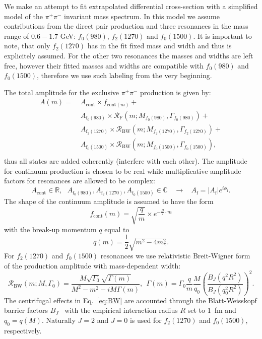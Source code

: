 We make an attempt to fit extrapolated differential cross-section with a simplified model of the $\pi^{+}\pi^{-}$ invariant mass spectrum. In this model we assume contributions from the direct pair production and three resonances in the mass range of $0.6-1.7$ GeV: $f_0(980)$, $f_2(1270)$ and $f_0(1500)$. It is important to note, that only $f_{2}(1270)$ has in the fit fixed mass and width and thus is explicitely assumed. For the other two resonances the masses and widths are left free, however their fitted masses and widths are compatible with $f_0(980)$ and $f_0(1500)$, therefore we use such labeling from the very beginning.

The total amplitude for the exclusive $\pi^{+}\pi^{-}$ production is given by:
%
\begin{equation}
\label{eq:amplitude}
\begin{aligned}
A(m) = & \;A_{\textrm{cont}}\times f_{\textrm{cont}(m)}+ \\
        & \;A_{\textrm{f}_0(980)} \times \mathcal{R}_{\textrm{F}}\left(m;M_{f_0(980)},\Gamma_{f_0(980)}\right)+ \\
        & \;A_{\textrm{f}_2(1270)} \times \mathcal{R}_{\textrm{BW}}\left(m;M_{f_2(1270)},\Gamma_{f_2(1270)}\right) +\\
        & \;A_{\textrm{f}_0(1500)} \times \mathcal{R}_{\textrm{BW}}\left(m;M_{f_0(1500)},\Gamma_{f_0(1500)}\right),\\
\end{aligned}
\end{equation}
%
thus all states are added coherently (interfere with each other). The amplitude for continuum production is chosen to be real while multiplicative amplitude factors for resonances are allowed to be complex:
\begin{equation}A_{\textrm{cont}}\in\mathbb{R},~~~A_{\textrm{f}_0(980)},A_{\textrm{f}_2(1270)},A_{\textrm{f}_0(1500)}\in\mathbb{C}~~~~\rightarrow~~~~A_{\textrm{f}}=|A_{\textrm{f}}|e^{i\phi_{\textrm{f}}}.\end{equation}
%
The shape of the continuum amplitude is assumed to have the form
\begin{equation}f_{\textrm{cont}}(m) = \sqrt{\frac{q}{m}}\times e^{-\frac{B}{2}\cdot m}\end{equation}
with the break-up momentum $q$ equal to
\begin{equation}\label{eq:breakupMom}
q(m) = \frac{1}{2}\sqrt{m^{2}-4m_{\pi}^{2}}.
\end{equation}
For $f_2(1270)$ and $f_0(1500)$ resonances we use relativistic Breit-Wigner form of the production amplitude with mass-dependent width:
\begin{equation}\label{eq:BW}\mathcal{R}_{\textrm{BW}}(m;M,\Gamma_{0}) = \frac{M\sqrt{\Gamma_{0}}\sqrt{\Gamma(m)}}{M^{2}-m^{2}-i M\Gamma(m)},~~\Gamma(m) = \Gamma_{0}\frac{q}{m}\frac{M}{q_{0}}\left(\frac{B_{J}(q^{2}R^{2})}{B_{J}(q_{0}^{2}R^{2})}\right)^{2}.\end{equation}
The centrifugal effects in Eq.~\eqref{eq:BW} are accounted through the Blatt-Weisskopf barrier factors $B_{J}$~\cite{BarrierFactors} with the empirical interaction radius $R$ set to 1~fm and $q_{0} = q(M)$. Naturally $J=2$ and $J=0$ is used for $f_2(1270)$ and $f_0(1500)$, respectively.

